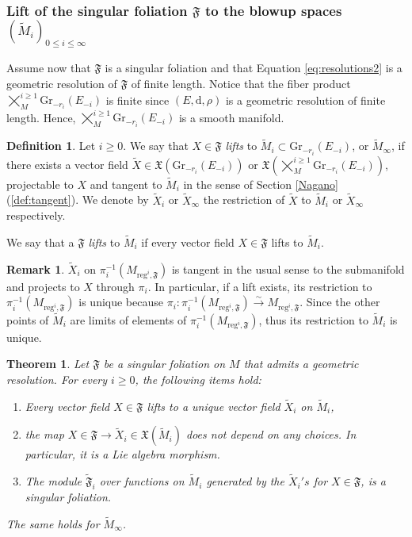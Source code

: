 \documentclass[10pt]{article}
\theoremstyle{plain}
\newtheorem{theorem}[lemma]{Theorem}
\theoremstyle{definition}
\newtheorem{definition}[lemma]{Definition}
\newtheorem{remark}[lemma]{Remark}
\theoremstyle{remark}
\newcommand{\dd}{\mathrm{d}}
\begin{document}
\subsubsection{Lift of the singular foliation $\mathfrak F$ to the blowup spaces $\left(\widetilde M_i\right)_{0\leq i\leq\infty}$}
Assume now that $\mathfrak{F}$ is a singular foliation and that Equation \eqref{eq:resolutions2} is a geometric resolution of $\mathfrak{F}$ of finite length. Notice that the fiber product $\bigtimes^{ i\geq 1}_M\mathrm{Gr}_{-r_i}({E_{-i}})$ is finite since $(E,\dd, \rho)$ is a geometric resolution of finite length. Hence, $\bigtimes^{ i\geq 1}_M\mathrm{Gr}_{-r_i}({E_{-i}})$ is a smooth manifold.
\begin{definition}
  Let $i\geq 0$. We say that $X\in \mathfrak F$ \emph{lifts} to  $\widetilde M_i\subset \mathrm{Gr}_{-r_i}(E_{-i})$, or $\widetilde M_\infty$, if there exists a vector field $\widetilde X\in \mathfrak X\left(\mathrm{Gr}_{-r_i}(E_{-i})\right)$ or $\mathfrak X\left(\bigtimes^{i\geq 1}_M\mathrm{Gr}_{-r_i}({E_{-i}})\right)$,  projectable to $X$ and  tangent to $\widetilde M_i$ in the sense of Section \ref{Nagano}(\ref{def:tangent}).  We denote by $\widetilde X_i$ or $\widetilde X_\infty$ the restriction of $\widetilde X$ to $\widetilde{M}_i$ or $\widetilde X_\infty$ respectively.
  
  
  We say that a $\mathfrak F$ \emph{lifts} to $\widetilde M_i$ if every vector field $X\in \mathfrak F$ lifts to $\widetilde M_i$.
\begin{remark}
$\widetilde X_i$ on $\pi_i^{-1}(M_{\mathrm{reg}^{i},\mathfrak F})$ is tangent in the usual sense to the submanifold and projects to $X$ through $\pi_i$. In particular, if a lift exists, {its restriction to $\pi^{-1}_i(M_{\mathrm{reg}^{i},\mathfrak F})$ is unique because $\pi_i\colon \pi_i^{-1}(M_{\mathrm{reg}^{i},\mathfrak F})\overset{\sim}{\longrightarrow} M_{\mathrm{reg}^{i},\mathfrak F}$. Since the other points of $\widetilde M_i$  are limits of elements of $\pi_i^{-1}(M_{\mathrm{reg}^{i},\mathfrak F})$, thus its restriction to $\widetilde M_i$ is unique}.      
\end{remark}
\end{definition}
\begin{theorem}\label{thm:trans2} Let $\mathfrak F$ be a singular foliation on $M$ that admits a geometric resolution. For every $i\geq 0$, the following items hold:
     \begin{enumerate}
         \item Every vector field $X\in \mathfrak{F}$ lifts to a unique vector field  $\widetilde X_i$ on $\widetilde M_i$,
         \item the map $X\in \mathfrak F \longrightarrow \widetilde X_i\in \mathfrak X(\widetilde M_i)$ does not depend on any choices. {In particular, it is a Lie algebra morphism.}%
         \item The module $\widetilde{\mathfrak F}_i$ over functions on $\widetilde M_i$ generated by the $\widetilde X_i's$ for $X\in \mathfrak F$, is a singular foliation.
     \end{enumerate}
     The same holds for $\widetilde M_\infty$.
\end{theorem}
\end{document}
